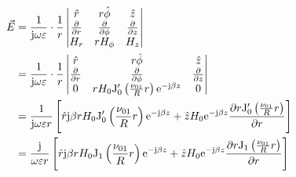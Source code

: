     \begin{align}
        \vec{E}&=\frac{1}{\mathrm{j}\omega\varepsilon}\cdot\frac{1}{r}\begin{vmatrix}
            \hat{r}&r\hat{\phi}&\hat{z}\\
            \frac{\partial }{\partial r}&\frac{\partial }{\partial \phi}&\frac{\partial }{\partial z}\\
            H_r&rH_\phi&H_z
        \end{vmatrix}\\
        &=\frac{1}{\mathrm{j}\omega\varepsilon}\cdot\frac{1}{r}\begin{vmatrix}
            \hat{r}&r\hat{\phi}&\hat{z}\\
            \frac{\partial }{\partial r}&\frac{\partial }{\partial \phi}&\frac{\partial }{\partial z}\\
            0&rH_0 \mathrm{J}_0'\left(\frac{\nu_{01}}{R}r\right)\mathrm{e}^{-\mathrm{j}\beta z}&0
        \end{vmatrix}\notag\\
        &=\frac{1}{\mathrm{j}\omega\varepsilon r}\left[\hat{r}\mathrm{j}\beta rH_0 \mathrm{J}_0'\left(\frac{\nu_{01}}{R}r\right)\mathrm{e}^{-\mathrm{j}\beta z}+\hat{z}H_0 \mathrm{e}^{-\mathrm{j}\beta z}\frac{\partial r\mathrm{J}_0'\left(\frac{\nu_{01}}{R}r\right)}{\partial r}\right]\notag\\
        &=\frac{\mathrm{j}}{\omega\varepsilon r}\left[\hat{r}\mathrm{j}\beta rH_0 \mathrm{J}_1\left(\frac{\nu_{01}}{R}r\right)\mathrm{e}^{-\mathrm{j}\beta z}+\hat{z}H_0 \mathrm{e}^{-\mathrm{j}\beta z}\frac{\partial r\mathrm{J}_1\left(\frac{\nu_{01}}{R}r\right)}{\partial r}\right]\notag
    \end{align}

